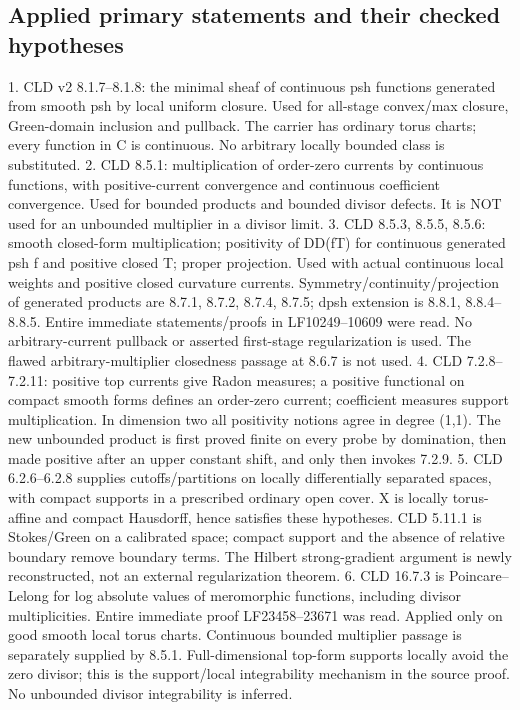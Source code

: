 \documentclass[11pt]{article}
\begin{document}
\subsection*{Applied primary statements and their checked hypotheses}

1. CLD v2 8.1.7--8.1.8: the minimal sheaf of continuous psh functions generated from smooth psh by local uniform closure. Used for all-stage convex/max closure, Green-domain inclusion and pullback. The carrier has ordinary torus charts; every function in C is continuous. No arbitrary locally bounded class is substituted.
2. CLD 8.5.1: multiplication of order-zero currents by continuous functions, with positive-current convergence and continuous coefficient convergence. Used for bounded products and bounded divisor defects. It is NOT used for an unbounded multiplier in a divisor limit.
3. CLD 8.5.3, 8.5.5, 8.5.6: smooth closed-form multiplication; positivity of DD(fT) for continuous generated psh f and positive closed T; proper projection. Used with actual continuous local weights and positive closed curvature currents. Symmetry/continuity/projection of generated products are 8.7.1, 8.7.2, 8.7.4, 8.7.5; dpsh extension is 8.8.1, 8.8.4--8.8.5. Entire immediate statements/proofs in LF10249--10609 were read. No arbitrary-current pullback or asserted first-stage regularization is used. The flawed arbitrary-multiplier closedness passage at 8.6.7 is not used.
4. CLD 7.2.8--7.2.11: positive top currents give Radon measures; a positive functional on compact smooth forms defines an order-zero current; coefficient measures support multiplication. In dimension two all positivity notions agree in degree (1,1). The new unbounded product is first proved finite on every probe by domination, then made positive after an upper constant shift, and only then invokes 7.2.9.
5. CLD 6.2.6--6.2.8 supplies cutoffs/partitions on locally differentially separated spaces, with compact supports in a prescribed ordinary open cover. X is locally torus-affine and compact Hausdorff, hence satisfies these hypotheses. CLD 5.11.1 is Stokes/Green on a calibrated space; compact support and the absence of relative boundary remove boundary terms. The Hilbert strong-gradient argument is newly reconstructed, not an external regularization theorem.
6. CLD 16.7.3 is Poincare--Lelong for log absolute values of meromorphic functions, including divisor multiplicities. Entire immediate proof LF23458--23671 was read. Applied only on good smooth local torus charts. Continuous bounded multiplier passage is separately supplied by 8.5.1. Full-dimensional top-form supports locally avoid the zero divisor; this is the support/local integrability mechanism in the source proof. No unbounded divisor integrability is inferred.
\end{document}
